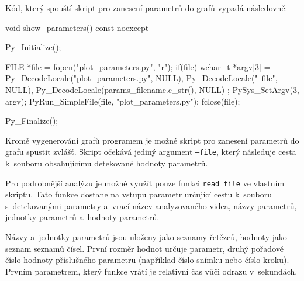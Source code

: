 Kód, který spouští skript pro zanesení parametrů do grafů vypadá následovně:
\begin{code}[fontsize=\footnotesize]
void show_parameters() const noexcept {
    Py_Initialize();

    FILE *file = fopen("plot_parameters.py", "r");
    if(file) {
        wchar_t *argv[3] = {
            Py_DecodeLocale("plot_parameters.py", NULL),
            Py_DecodeLocale("--file", NULL),
            Py_DecodeLocale(params_filename.c_str(), NULL)
        };
        PySys_SetArgv(3, argv);
        PyRun_SimpleFile(file, "plot_parameters.py");
        fclose(file);
    }

    Py_Finalize();
}
\end{code}

Kromě vygenerování grafů programem je možné skript pro zanesení parametrů do grafu spustit zvlášť. Skript očekává jediný argument \texttt{--file}, který následuje cesta k~souboru obsahujícímu detekované hodnoty parametrů.

Pro podrobnější analýzu je možné využít pouze funkci \texttt{read\_file} ve vlastním skriptu. Tato funkce dostane na vstupu parametr určující cestu k~souboru s~detekovanými parametry a~vrací název analyzovaného videa, názvy parametrů, jednotky parametrů a~hodnoty parametrů.

Názvy a~jednotky parametrů jsou uloženy jako seznamy řetězců, hodnoty jako seznam seznamů čísel. První rozměr hodnot určuje parametr, druhý pořadové číslo hodnoty příslušného parametru (například číslo snímku nebo číslo kroku). Prvním parametrem, který funkce vrátí je relativní čas vůči odrazu v~sekundách.





































